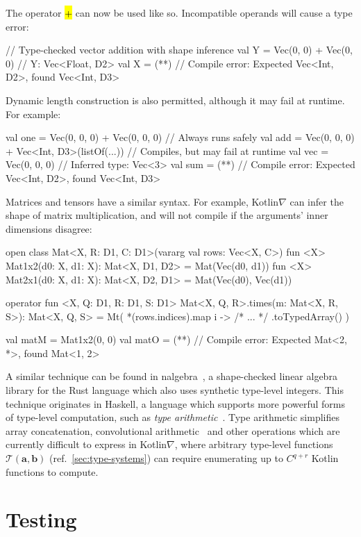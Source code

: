 \documentclass[12pt,initial,twoside,maitrise]{dms}
\makeatletter
\def\uwave{\bgroup \markoverwith{\lower3.5\p@\hbox{\sixly \textcolor{red}{\char58}}}\ULon}
\newcommand{\inline}[1]{%
    \begingroup%
    \sethlcolor{slightgray}%
    \hl{\ttfamily\footnotesize #1}%
    \endgroup
}
\numberwithin{equation}{section}
\numberwithin{table}{chapter}
\numberwithin{figure}{chapter}
\makeatother
\begin{document}
%
The operator \inline{+} can now be used like so. Incompatible operands will cause a type error:
%
\begin{kotlinlisting}
// Type-checked vector addition with shape inference
val Y = Vec(0, 0) + Vec(0, 0) // Y: Vec<Float, D2>
val X = (*\uwave{Vec(0, 0) + Vec(0, 0, 0)}*) // Compile error: Expected Vec<Int, D2>, found Vec<Int, D3>
\end{kotlinlisting}
%
Dynamic length construction is also permitted, although it may fail at runtime. For example:
%
\begin{kotlinlisting}
val one = Vec(0, 0, 0) + Vec(0, 0, 0) // Always runs safely
val add = Vec(0, 0, 0) + Vec<Int, D3>(listOf(...)) // Compiles, but may fail at runtime
val vec = Vec(0, 0, 0) // Inferred type: Vec<3>
val sum = (*\uwave{Vec(0, 0) + add}*) // Compile error: Expected Vec<Int, D2>, found Vec<Int, D3>
\end{kotlinlisting}
%
Matrices and tensors have a similar syntax. For example, Kotlin$\nabla$ can infer the shape of matrix multiplication, and will not compile if the arguments' inner dimensions disagree:
%
\begin{kotlinlisting}
open class Mat<X, R: D1, C: D1>(vararg val rows: Vec<X, C>)
fun <X> Mat1x2(d0: X, d1: X): Mat<X, D1, D2> = Mat(Vec(d0, d1))
fun <X> Mat2x1(d0: X, d1: X): Mat<X, D2, D1> = Mat(Vec(d0), Vec(d1))

operator fun <X, Q: D1, R: D1, S: D1> Mat<X, Q, R>.times(m: Mat<X, R, S>): Mat<X, Q, S> =
    Mt( *(rows.indices).map { i -> /* ... */ }.toTypedArray() )

val matM = Mat1x2(0, 0)
val matO = (*\uwave{matM *\ matM}*) // Compile error: Expected Mat<2, *>, found Mat<1, 2>
\end{kotlinlisting}
%
A similar technique can be found in nalgebra~\citep{crozet2019nalgebra}, a shape-checked linear algebra library for the Rust language which also uses synthetic type-level integers. This technique originates in Haskell, a language which supports more powerful forms of type-level computation, such as \textit{type arithmetic}~\citep{kiselyov2005number}. Type arithmetic simplifies array concatenation, convolutional arithmetic~\citep{dumoulin2016guide} and other operations which are currently difficult to express in Kotlin$\nabla$, where arbitrary type-level functions $\mathcal{T}(\mathbf a, \mathbf b)$ (ref.~\autoref{sec:type-systems}) can require enumerating up to $C^{q + r}$ Kotlin functions to compute.

\section{Testing}\label{sec:testing}
\end{document}
